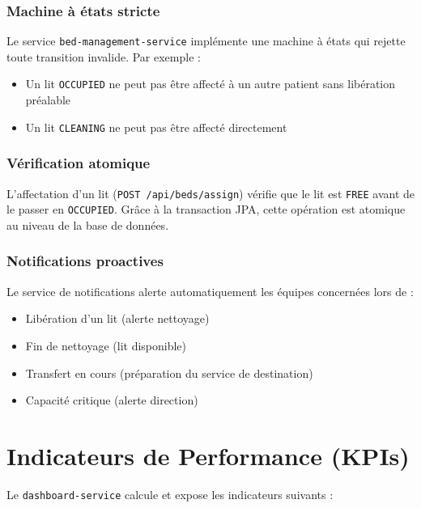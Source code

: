 \documentclass[12pt,a4paper]{report}
\begin{document}
\subsection{Machine \`a \'etats stricte}

Le service \texttt{bed-management-service} impl\'emente une machine \`a \'etats qui rejette toute transition invalide. Par exemple :
\begin{itemize}
    \item Un lit \texttt{OCCUPIED} ne peut pas \^etre affect\'e \`a un autre patient sans lib\'eration pr\'ealable
    \item Un lit \texttt{CLEANING} ne peut pas \^etre affect\'e directement
\end{itemize}

\subsection{V\'erification atomique}

L'affectation d'un lit (\texttt{POST /api/beds/assign}) v\'erifie que le lit est \texttt{FREE} avant de le passer en \texttt{OCCUPIED}. Gr\^ace \`a la transaction JPA, cette op\'eration est atomique au niveau de la base de donn\'ees.

\subsection{Notifications proactives}

Le service de notifications alerte automatiquement les \'equipes concern\'ees lors de :
\begin{itemize}
    \item Lib\'eration d'un lit (alerte nettoyage)
    \item Fin de nettoyage (lit disponible)
    \item Transfert en cours (pr\'eparation du service de destination)
    \item Capacit\'e critique (alerte direction)
\end{itemize}

\chapter{Indicateurs de Performance (KPIs)}

Le \texttt{dashboard-service} calcule et expose les indicateurs suivants :
\end{document}
